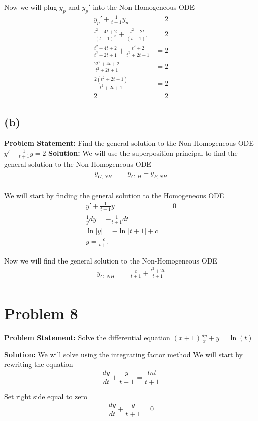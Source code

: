 \documentclass[12pt, letterpaper]{article}
\begin{document}
Now we will plug $y_p$ and $y_p'$ into the Non-Homogeneous ODE
\begin{align*}
y_p' + \frac{1}{t+1}y_p &= 2 \\
\frac{t^2 + 4t + 2}{(t+1)^2} + \frac{t^2 + 2t}{(t+1)^2} &= 2 \\
\frac{t^2 + 4t + 2 }{t^2 + 2t + 1} + \frac{t^2+2}{t^2 + 2t + 1} &= 2 \\
\frac{2t^2 + 4t + 2}{t^2 + 2t + 1} &= 2 \\
\frac{2(t^2 + 2t + 1)}{t^2 + 2t + 1} &= 2 \\
2 &= 2
\end{align*}

\subsection*{(b)}
\textbf{Problem Statement:} Find the general solution to the Non-Homogeneous ODE $y' + \frac{1}{t+1}y = 2$
\textbf{Solution:} We will use the superposition principal to find the general solution to the Non-Homogeneous ODE
\begin{align*}
y_{G,NH} &= y_{G,H} + y_{P,NH} \\
\end{align*}

We will start by finding the general solution to the Homogeneous ODE
\begin{align*}
y' + \frac{1}{t+1}y &= 0 \\
\frac{1}{y}dy = -\frac{1}{t+1}dt \\
\ln|y| = -\ln|t+1| + c \\
y = \frac{c}{t+1}
\end{align*}

Now we will find the general solution to the Non-Homogeneous ODE
\begin{align*}
y_{G,NH} &= \frac{c}{t+1} + \frac{t^2 + 2t}{t+1} \\
\end{align*}

\section*{Problem 8}
\textbf{Problem Statement:} Solve the differential equation $(x+1)\frac{dy}{x}+y = \ln(t)$

\textbf{Solution:} We will solve using the integrating factor method
We will start by rewriting the equation
\[
\frac{dy}{dt} + \frac{y}{t+1} = \frac{lnt}{t+1}
\]

Set right side equal to zero
\[
\frac{dy}{dt} + \frac{y}{t+1} = 0
\]
\end{document}
